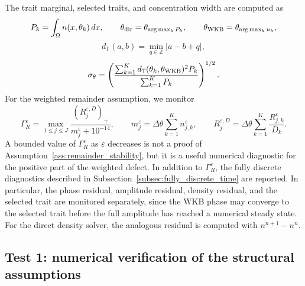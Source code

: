 \documentclass[11pt]{article}
\begin{document}
The trait marginal, selected traits, and concentration width are computed as
\begin{equation}\label{eq:diagnostics_trait_new}
    P_k=\int_\Omega n(x,\theta_k)\,dx,
    \qquad
    \theta_{\rm dir}=\theta_{\arg\max_k P_k},
    \qquad
    \theta_{\rm WKB}=\theta_{\arg\max_k u_k},
\end{equation}
\begin{equation}\label{eq:periodic_distance_new}
    d_{\mathbb T}(a,b)=\min_{q\in\mathbb Z}|a-b+q|,
\end{equation}
\begin{equation}\label{eq:sigma_theta_new}
    \sigma_\theta=
    \left(
    \frac{\sum_{k=1}^{K}d_{\mathbb T}(\theta_k,\theta_{\rm WKB})^2P_k}
         {\sum_{k=1}^{K}P_k}
    \right)^{1/2}.
\end{equation}
For the weighted remainder assumption, we monitor
\begin{equation}\label{eq:gamma_R_new}
    \Gamma_R^\varepsilon
    =
    \max_{1\le j\le J}
    \frac{(R_j^{\varepsilon,D})_+}{m_j^\varepsilon+10^{-14}},
    \qquad
    m_j^\varepsilon=\Delta\theta\sum_{k=1}^{K}n_{j,k}^\varepsilon,
    \qquad
    R_j^{\varepsilon,D}=\Delta\theta\sum_{k=1}^{K}\frac{R_{j,k}^\varepsilon}{D_k}.
\end{equation}
A bounded value of \(\Gamma_R^\varepsilon\) as \(\varepsilon\) decreases is not a proof of Assumption~\ref{ass:remainder_stability}, but it is a useful numerical diagnostic for the positive part of the weighted defect. {\color{red} In addition to \(\Gamma_R^\varepsilon\), the fully discrete diagnostics described in Subsection~\ref{subsec:fully_discrete_time} are reported. In particular, the phase residual, amplitude residual, density residual, and the selected trait are monitored separately, since the WKB phase may converge to the selected trait before the full amplitude has reached a numerical steady state.} For the direct density solver, the analogous residual is computed with \(n^{n+1}-n^n\).

\subsection{Test 1: numerical verification of the structural assumptions}\label{subsec:test_assumptions_new}
\end{document}
